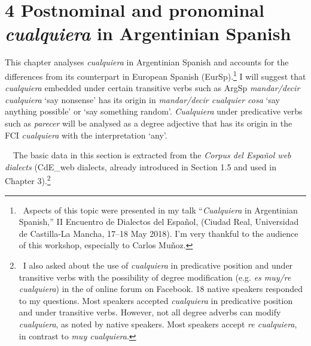 \clearpage\section[4 Postnominal and pronominal cualquiera in Argentinian Spanish]{\textbf{4 Postnominal and pronominal }\textbf{\textit{cualquiera }}\textbf{in Argentinian Spanish}}
\begin{styleStandard}
This chapter analyses \textit{cualquiera} in Argentinian Spanish and accounts for the differences from its counterpart in European Spanish (EurSp).\footnote{\textrm{\ Aspects of this topic were presented in my talk “}\textrm{\textit{Cualquiera}}\textrm{ in Argentinian Spanish,” II Encuentro de Dialectos del Español, (Ciudad Real, Universidad de Castilla-La Mancha, 17–18 May 2018). I’m very thankful to the audience of this workshop, especially to Carlos Muñoz.}} I will suggest that \textit{cualquiera} embedded under certain transitive verbs such as ArgSp \textit{mandar/decir cualquiera} ‘say nonsense’ has its origin in \textit{mandar/decir cualquier cosa} ‘say anything possible’ or ‘say something random’. \textit{Cualquiera} under predicative verbs such as \textit{parecer} will be analysed as a degree adjective that has its origin in the FCI \textit{cualquiera} with the interpretation ‘any’.
\end{styleStandard}

\begin{styleStandard}
\ \ The basic data in this section is extracted from the \textit{Corpus del Español web dialects }(CdE\_web dialects, already introduced in Section 1.5 and used in Chapter 3).\footnote{\ \textrm{I also asked about the use of }\textrm{\textit{cualquiera}}\textrm{ in predicative position and under transitive verbs with the possibility of degree modification (e.g. }\textrm{\textit{es muy/re cualquiera}}\textrm{) in the of }\href{https://www.facebook.com/groups/686284488187168/permalink/992126550936292/}{}\textrm{ online forum on Facebook}.\textrm{ 18 native speakers responded to my questions. Most speakers accepted }\textrm{\textit{cualquiera}}\textrm{ in predicative position and under transitive verbs. However, not all degree adverbs can modify }\textrm{\textit{cualquiera}}\textrm{, as noted by native speakers. Most speakers accept }\textrm{\textit{re cualquiera}}\textrm{, in contrast to }\textrm{\textit{muy cualquiera}}\textrm{.}}
\end{styleStandard}

